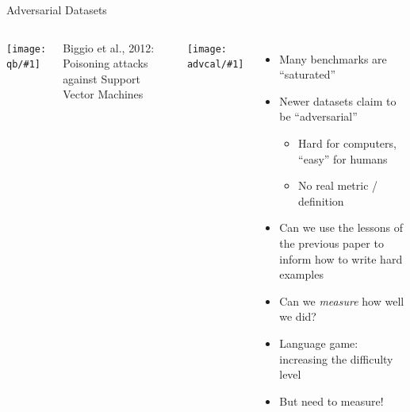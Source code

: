 \documentclass[compress]{beamer}
\newcommand{\gfxq}[2]{
\begin{center}
	\texttt{[image: qb/\#1]}
\end{center}
}
\newcommand{\gfxa}[2]{
	\begin{center}
		\texttt{[image: advcal/\#1]}
	\end{center}
}
\begin{document}
  \begin{frame}{Adversarial Datasets}

    \begin{columns}
      \gfxq{benchmark_saturation}{0.75}
Biggio et al., 2012: Poisoning attacks against Support Vector Machines

              \gfxa{adversarial_turtle}{.6}


            \begin{itemize}
              
            \item Many benchmarks are ``saturated''
            \item Newer datasets claim to be ``adversarial''
              \begin{itemize}
              \item Hard for computers, ``easy'' for humans
              \item No real metric / definition
              \end{itemize}
            \item Can we use the lessons of the previous paper to inform how to write hard examples
            \item Can we \emph{measure} how well we did?
              \pause
            \item Language game: increasing the difficulty level
              \item But need to measure!
    \end{itemize}
            \end{columns}
 \end{frame}
    
\end{document}
